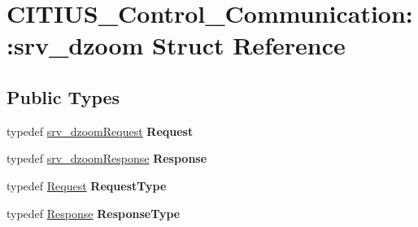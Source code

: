 \hypertarget{struct_c_i_t_i_u_s___control___communication_1_1srv__dzoom}{\section{\-C\-I\-T\-I\-U\-S\-\_\-\-Control\-\_\-\-Communication\-:\-:srv\-\_\-dzoom \-Struct \-Reference}
\label{struct_c_i_t_i_u_s___control___communication_1_1srv__dzoom}
}
\subsection*{\-Public \-Types}
\begin{DoxyCompactItemize}
\item 
\hypertarget{struct_c_i_t_i_u_s___control___communication_1_1srv__dzoom_a93d56840a380b2af68ae153485c78160}{typedef \hyperlink{struct_c_i_t_i_u_s___control___communication_1_1srv__dzoom_request__}{srv\-\_\-dzoom\-Request} {\bfseries \-Request}}\label{struct_c_i_t_i_u_s___control___communication_1_1srv__dzoom_a93d56840a380b2af68ae153485c78160}

\item 
\hypertarget{struct_c_i_t_i_u_s___control___communication_1_1srv__dzoom_ab1f254b410eb3f8fef520f2e3ffac43d}{typedef \hyperlink{struct_c_i_t_i_u_s___control___communication_1_1srv__dzoom_response__}{srv\-\_\-dzoom\-Response} {\bfseries \-Response}}\label{struct_c_i_t_i_u_s___control___communication_1_1srv__dzoom_ab1f254b410eb3f8fef520f2e3ffac43d}

\item 
\hypertarget{struct_c_i_t_i_u_s___control___communication_1_1srv__dzoom_a1bc61b1f8553ad75248fa6a96a56d8bd}{typedef \hyperlink{struct_c_i_t_i_u_s___control___communication_1_1srv__dzoom_request__}{\-Request} {\bfseries \-Request\-Type}}\label{struct_c_i_t_i_u_s___control___communication_1_1srv__dzoom_a1bc61b1f8553ad75248fa6a96a56d8bd}

\item 
\hypertarget{struct_c_i_t_i_u_s___control___communication_1_1srv__dzoom_a9b812586ac6552c973421670a7e82be6}{typedef \hyperlink{struct_c_i_t_i_u_s___control___communication_1_1srv__dzoom_response__}{\-Response} {\bfseries \-Response\-Type}}\label{struct_c_i_t_i_u_s___control___communication_1_1srv__dzoom_a9b812586ac6552c973421670a7e82be6}

\end{DoxyCompactItemize}
